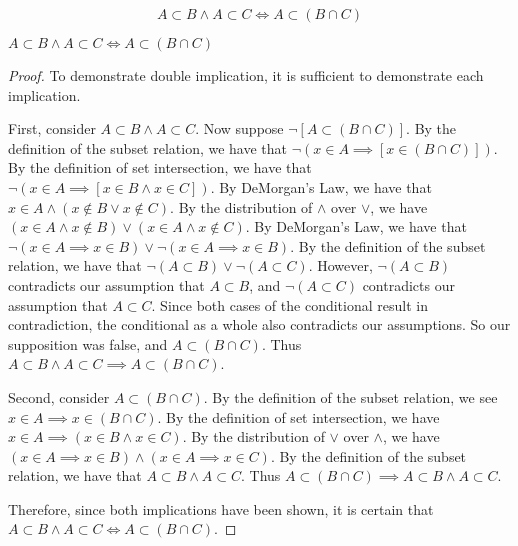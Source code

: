 \documentclass[main.tex]{subfiles}
\begin{document}
\subproblem{}\label{2c}
\[A \subset B \land A \subset C \iff A \subset (B \cap C)\]
\begin{thm}
	\(A \subset B \land A \subset C \iff A \subset (B \cap C)\)
\end{thm}
\begin{proof}
	To demonstrate double implication, it is sufficient to demonstrate each
	implication.

	\medskip{}
	First, consider \(A \subset B \land A \subset C\). Now suppose
	\(\neg [A \subset (B \cap C)]\). By the definition of the subset
	relation, we have that
	\(\neg (x \in A \implies [x \in (B \cap C)])\). By the definition of
	set intersection, we have that
	\(\neg (x \in A \implies [x \in B \land x \in C])\). By DeMorgan's Law,
	we have that \(x \in A \land (x \notin B \lor x \notin C)\). By the
	distribution of \(\land\) over \(\lor\), we have
	\((x \in A \land x \notin B) \lor (x \in A \land x \notin C)\). By
	DeMorgan's Law, we have that
	\(\neg (x \in A \implies x \in B) \lor \neg (x \in A \implies x \in B)\).
	By the definition of the subset relation, we have that
	\(\neg (A \subset B) \lor \neg (A \subset C)\). However,
	\(\neg (A \subset B)\) contradicts our assumption that \(A \subset B\),
	and \(\neg (A \subset C)\) contradicts our assumption that
	\(A \subset C\). Since both cases of the conditional result in
	contradiction, the conditional as a whole also contradicts our
	assumptions. So our supposition was false, and \(A \subset (B \cap C)\).
	Thus \(A \subset B \land A \subset C \implies A \subset (B \cap C)\).

	\medskip{}
	Second, consider \(A \subset (B \cap C)\). By the definition of the
	subset relation, we see \(x \in A \implies x \in (B \cap C)\). By the
	definition of set intersection, we have
	\(x \in A \implies (x \in B \land x \in C)\). By the distribution of
	\(\lor\) over \(\land\), we have
	\((x \in A \implies x \in B) \land (x \in A \implies x \in C)\). By the
	definition of the subset relation, we have that
	\(A \subset B \land A \subset C\). Thus
	\(A \subset (B \cap C) \implies A \subset B \land A \subset C\).

	\medskip{}
	Therefore, since both implications have been shown, it is certain that
	\(A \subset B \land A \subset C \iff A \subset (B \cap C)\).
\end{proof}
\end{document}
